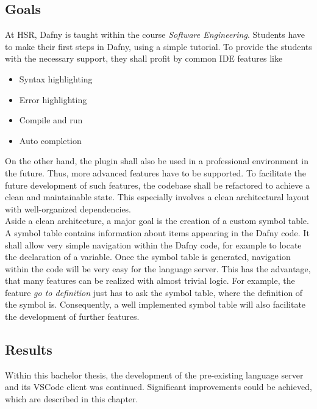 \subsection{Goals}
At HSR, Dafny is taught within the course \textit{Software Engineering}.
Students have to make their first steps in Dafny, using a simple tutorial.
To provide the students with the necessary support, they shall profit by common IDE features like
\begin{itemize}
    \item Syntax highlighting
    \item Error highlighting
    \item Compile and run
    \item Auto completion 
\end{itemize}

On the other hand, the plugin shall also be used in a professional environment in the future.
Thus, more advanced features have to be supported.
To facilitate the future development of such features, the codebase shall be refactored to achieve a clean and maintainable state.
This especially involves a clean architectural layout with well-organized dependencies.\\

Aside a clean architecture, a major goal is the creation of a custom symbol table.
A symbol table contains information about items appearing in the Dafny code.
It shall allow very simple navigation within the Dafny code, for example to locate the declaration of a variable.
Once the symbol table is generated, navigation within the code will be very easy for the language server.
This has the advantage, that many features can be realized with almost trivial logic.
For example, the feature \textit{go to definition} just has to ask the symbol table, where the definition of the symbol is.
Consequently, a well implemented symbol table will also facilitate the development of further features.



\subsection{Results}
Within this bachelor thesis, the development of the pre-existing language server and its VSCode client was continued.
Significant improvements could be achieved, which are described in this chapter.

